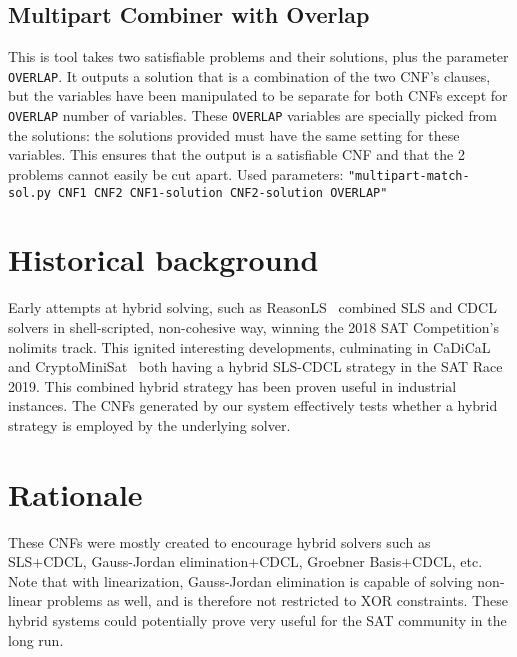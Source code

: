 \documentclass[final]{ieee}
\begin{document}
\subsection{Multipart Combiner with Overlap}
This is tool takes two satisfiable problems and their solutions, plus the parameter \texttt{OVERLAP}. It outputs a solution that is a combination of the two CNF's clauses, but the variables have been manipulated to be separate for both CNFs except for \texttt{OVERLAP} number of variables. These \texttt{OVERLAP} variables are specially picked from the solutions: the solutions provided must have the same setting for these variables. This ensures that the output is a satisfiable CNF and that the 2 problems cannot easily be cut apart. Used parameters: \texttt{"multipart-match-sol.py CNF1 CNF2 CNF1-solution CNF2-solution OVERLAP"}


\section{Historical background}
Early attempts at hybrid solving, such as ReasonLS~\cite{shaoweixindi} combined SLS and CDCL solvers in shell-scripted, non-cohesive way, winning the 2018 SAT Competition's nolimits track. This ignited interesting developments, culminating in CaDiCaL~\cite{biere2018cadical} and CryptoMiniSat~\cite{CMS} both having a hybrid SLS-CDCL strategy in the SAT Race 2019. This combined hybrid strategy has been proven useful in industrial instances. The CNFs generated by our system effectively tests whether a hybrid strategy is employed by the underlying solver.

\section{Rationale}
These CNFs were mostly created to encourage hybrid solvers such as SLS+CDCL, Gauss-Jordan elimination+CDCL, Groebner Basis+CDCL, etc. Note that with linearization, Gauss-Jordan elimination is capable of solving non-linear problems as well, and is therefore not restricted to XOR constraints. These hybrid systems could potentially prove very useful for the SAT community in the long run.




\vfill
\pagebreak
\end{document}
